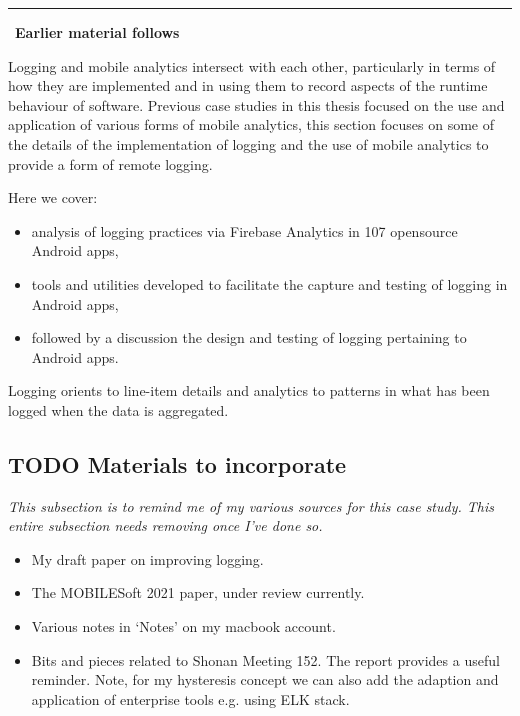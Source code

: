 \par\noindent\rule{\textwidth}{0.4pt}
~\textbf{Earlier material follows}

Logging and mobile analytics intersect with each other, particularly in terms of how they are implemented and in using them to record aspects of the runtime behaviour of software. Previous case studies in this thesis focused on the use and application of various forms of mobile analytics, this section focuses on some of the details of the implementation of logging and the use of mobile analytics to provide a form of remote logging. 

Here we cover:
\begin{itemize}
    \item analysis of logging practices via Firebase Analytics in 107 opensource Android apps,
    \item tools and utilities developed to facilitate the capture and testing of logging in Android apps,
    \item followed by a discussion the design and testing of logging pertaining to Android apps.
\end{itemize}

Logging orients to line-item details and analytics to patterns in what has been logged when the data is aggregated.

\subsection{TODO Materials to incorporate}
\textit{This subsection is to remind me of my various sources for this case study. This entire subsection needs removing once I've done so.}
\begin{itemize}
    \item My draft paper on improving logging.
    \item The MOBILESoft 2021 paper, under review currently.
    \item Various notes in `Notes' on my macbook account.
    \item Bits and pieces related to Shonan Meeting 152. The report provides a useful reminder. Note, for my hysteresis concept we can also add the adaption and application of enterprise tools e.g. using ELK stack.  
\end{itemize}


